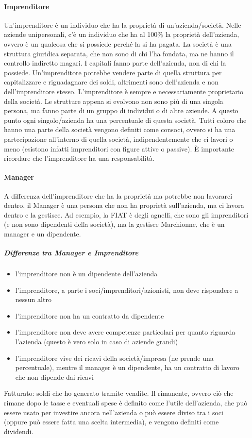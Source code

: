 \paragraph*{Imprenditore} Un'imprenditore è un individuo che ha la
proprietà di un'azienda/società. Nelle aziende unipersonali, c'è un individuo
che ha al 100\% la proprietà dell'azienda, ovvero è un qualcosa che si possiede
perché la si ha pagata. La società è una struttura giuridica separata, che non
sono di chi l'ha fondata, ma ne hanno il controllo indiretto magari. I capitali
fanno parte dell'azienda, non di chi la possiede. Un'imprenditore potrebbe
vendere parte di quella struttura per capitalizzare e riguadagnare dei soldi,
altrimenti sono dell'azienda e non dell'imprenditore stesso. L'imprenditore è
sempre e necessariamente proprietario della società.
Le strutture appena si evolvono non sono più di una singola persona, ma fanno
parte di un gruppo di individui o di altre aziende. A questo punto ogni
singolo/azienda ha una percentuale di questa società. Tutti coloro che hanno
una parte della società vengono definiti come consoci, ovvero si ha una
partecipazione all'interno di quella società, indipendentemente che ci lavori o
meno (esistono infatti imprenditori con figure attive o passive).
È importante ricordare che l'imprenditore ha una responsabilità.

\paragraph*{Manager} A differenza dell'imprenditore che ha la proprietà ma
potrebbe non lavorarci dentro, il Manager è una persona che non ha proprietà
sull'azienda, ma ci lavora dentro e la gestisce.
Ad esempio, la FIAT è degli agnelli, che sono gli imprenditori (e non sono
dipendenti della società), ma la gestisce Marchionne, che è un manager e un
dipendente.

\subparagraph*{Differenze tra Manager e Imprenditore}
\begin{itemize}
 \item l'imprenditore non è un dipendente dell'azienda
 \item l'imprenditore, a parte i soci/imprenditori/azionisti, non deve
rispondere a nessun altro
 \item l'imprenditore non ha un contratto da dipendente
 \item l'imprenditore non deve avere competenze particolari per quanto riguarda
l'azienda (questo è vero solo in caso di aziende grandi)
 \item l'imprenditore vive dei ricavi della società/impresa (ne prende una
percentuale), mentre il manager è un dipendente, ha un contratto di lavoro che
non dipende dai ricavi \\[0.5cm] 
\end{itemize}
Fatturato: soldi che ho generato tramite vendite. Il rimanente, ovvero ciò che
rimane dopo le tasse e eventuali spese è definito come l'utile dell'azienda,
che può essere usato per investire ancora nell'azienda o può essere diviso tra
i soci (oppure può essere fatta una scelta intermedia), e vengono definiti come
dividendi.
